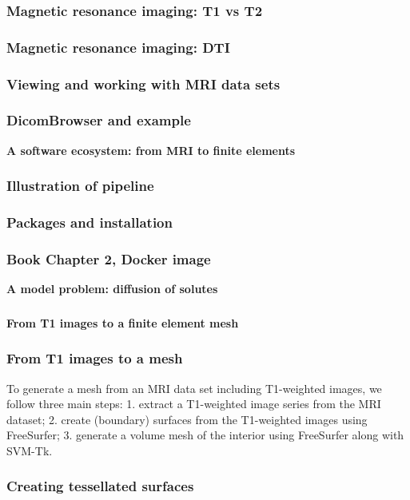 \documentclass[mathserif, aspectratio=169]{beamer}
\newcommand{\mysection}[1]{\begin{frame} \begin{center} \vspace{3em} \textbf{#1} \end{center} \end{frame}}
\begin{document}
\begin{frame}
  \frametitle{Magnetic resonance imaging: T1 vs T2}
\end{frame}

\begin{frame}
  \frametitle{Magnetic resonance imaging: DTI}
\end{frame}

\begin{frame}
  \frametitle{Viewing and working with MRI data sets}
\end{frame}

\begin{frame}
  \frametitle{DicomBrowser and example}
\end{frame}

\mysection{A software ecosystem: from MRI to finite elements}

\begin{frame}
\frametitle{Illustration of pipeline}
\end{frame}

\begin{frame}
\frametitle{Packages and installation}
\end{frame}

\begin{frame}
\frametitle{Book Chapter 2, Docker image}
\end{frame}

%
% 
%

\mysection{A model problem: diffusion of solutes}

\begin{frame}
\frametitle{}
\end{frame}

\mysection{From T1 images to a finite element mesh}

\begin{frame}
\frametitle{From T1 images to a mesh}

To generate a mesh from an MRI data set including T1-weighted images, we
follow three main steps:
1. extract a T1-weighted image series from the MRI dataset;
2. create (boundary) surfaces from the T1-weighted images using FreeSurfer;
3. generate a volume mesh of the interior using FreeSurfer along with SVM-Tk.
\end{frame}


\begin{frame}
\frametitle{Creating tessellated surfaces}
\end{frame}
\end{document}
